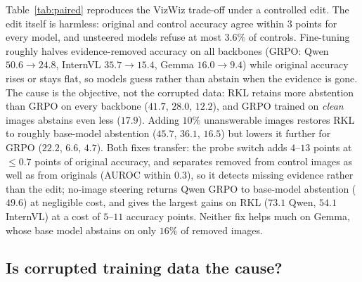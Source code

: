 Table~\ref{tab:paired} reproduces the VizWiz trade-off under a controlled edit. The edit
itself is harmless: original and control accuracy agree within $3$ points for every model,
and unsteered models refuse at most $3.6\%$ of controls. Fine-tuning roughly halves
evidence-removed accuracy on all backbones (GRPO: Qwen $50.6\rightarrow24.8$, InternVL
$35.7\rightarrow15.4$, Gemma $16.0\rightarrow9.4$) while original accuracy rises or stays
flat, so models guess rather than abstain when the evidence is gone. The cause is the
objective, not the corrupted data: RKL retains more abstention than GRPO on every backbone
($41.7$, $28.0$, $12.2$), and GRPO trained on \emph{clean} images abstains even less
($17.9$). Adding $10\%$ unanswerable images restores RKL to roughly base-model abstention
($45.7$, $36.1$, $16.5$) but lowers it further for GRPO ($22.2$, $6.6$, $4.7$). Both fixes
transfer: the probe switch adds $4$--$13$ points at $\leq0.7$ points of original accuracy,
and separates removed from control images as well as from originals (AUROC within $0.3$),
so it detects missing evidence rather than the edit; no-image steering returns Qwen GRPO
to base-model abstention ($49.6$) at negligible cost, and gives the largest gains on RKL
($73.1$ Qwen, $54.1$ InternVL) at a cost of $5$--$11$ accuracy points. Neither fix helps
much on Gemma, whose base model abstains on only $16\%$ of removed images.
\subsection{Is corrupted training data the cause?}
\label{sec:clean_grpo}


